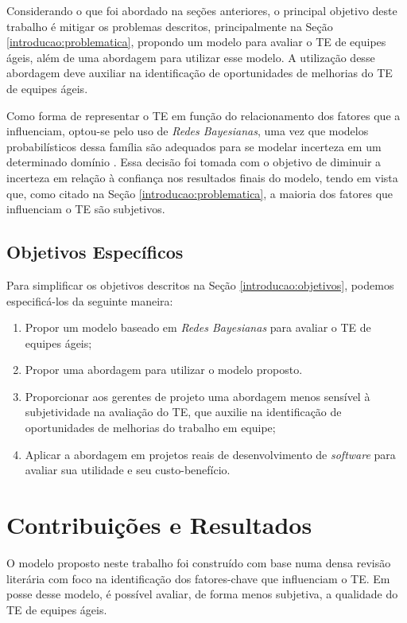 Considerando o que foi abordado na seções anteriores, o principal objetivo deste trabalho é mitigar os problemas descritos, principalmente na Seção \ref{introducao:problematica}, propondo um modelo para avaliar o TE de equipes ágeis, além de uma abordagem para utilizar esse modelo. A utilização desse abordagem deve auxiliar na identificação de oportunidades de melhorias do TE de equipes ágeis.

Como forma de representar o TE em função do relacionamento dos fatores que a influenciam, optou-se pelo uso de \textit{Redes Bayesianas}, uma vez que modelos probabilísticos dessa família são adequados para se modelar incerteza em um determinado domínio \cite{bengal}. Essa decisão foi tomada com o objetivo de diminuir a incerteza em relação à confiança nos resultados finais do modelo, tendo em vista que, como citado na Seção \ref{introducao:problematica}, a maioria dos fatores que influenciam o TE são subjetivos.

\subsection{Objetivos Específicos}
\label{introducao:objetivos:especificos}

Para simplificar os objetivos descritos na Seção \ref{introducao:objetivos}, podemos especificá-los da seguinte maneira:

\begin{enumerate}
  \item Propor um modelo baseado em \textit{Redes Bayesianas} para avaliar o TE de equipes ágeis;
  \item Propor uma abordagem para utilizar o modelo proposto.
  \item Proporcionar aos gerentes de projeto uma abordagem menos sensível à subjetividade na avaliação do TE, que auxilie na identificação de oportunidades de melhorias do trabalho em equipe;
  \item Aplicar a abordagem em projetos reais de desenvolvimento de \textit{software} para avaliar sua utilidade e seu custo-benefício.
\end{enumerate}

\section{Contribuições e Resultados}
\label{introducao:resultados}

O modelo proposto neste trabalho foi construído com base numa densa revisão literária com foco na identificação dos fatores-chave que influenciam o TE. Em posse desse modelo, é possível avaliar, de forma menos subjetiva, a qualidade do TE de equipes ágeis.

